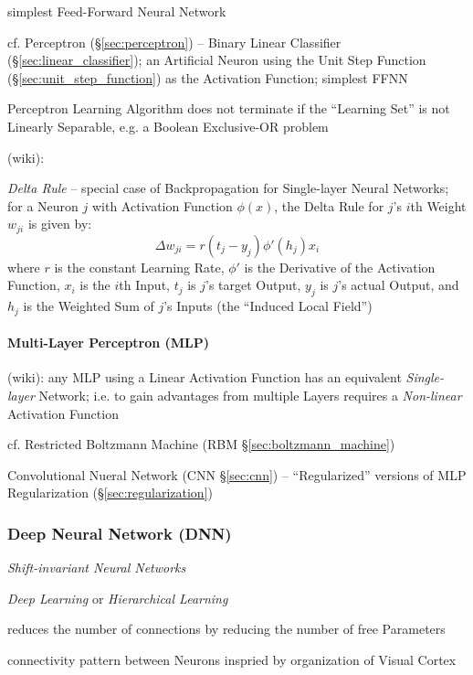 simplest Feed-Forward Neural Network

cf. Perceptron (\S\ref{sec:perceptron}) -- Binary Linear Classifier
(\S\ref{sec:linear_classifier}); an Artificial Neuron using the Unit Step
Function (\S\ref{sec:unit_step_function}) as the Activation Function; simplest
FFNN

Perceptron Learning Algorithm does not terminate if the ``Learning Set'' is not
Linearly Separable, e.g. a Boolean Exclusive-OR problem

(wiki):

\emph{Delta Rule} -- special case of Backpropagation for Single-layer Neural
Networks; for a Neuron $j$ with Activation Function $\phi(x)$, the Delta Rule
for $j$'s $i$th Weight $w_{ji}$ is given by:
\[
  \Delta w_{ji} = r(t_j - y_j) \phi'(h_j) x_i
\]
where $r$ is the constant Learning Rate, $\phi'$ is the Derivative of the
Activation Function, $x_i$ is the $i$th Input, $t_j$ is $j$'s target Output,
$y_j$ is $j$'s actual Output, and $h_j$ is the Weighted Sum of $j$'s Inputs (the
``Induced Local Field'')



\paragraph{Multi-Layer Perceptron (MLP)}\label{sec:mlp}\hfill

(wiki): any MLP using a Linear Activation Function has an equivalent
\emph{Single-layer} Network; i.e. to gain advantages from multiple Layers
requires a \emph{Non-linear} Activation Function

cf. Restricted Boltzmann Machine (RBM \S\ref{sec:boltzmann_machine})

\fist Convolutional Nueral Network (CNN \S\ref{sec:cnn}) -- ``Regularized''
versions of MLP \fist Regularization (\S\ref{sec:regularization})



\subsubsection{Deep Neural Network (DNN)}\label{sec:dnn}

\emph{Shift-invariant Neural Networks}

\emph{Deep Learning} or \emph{Hierarchical Learning}

reduces the number of connections by reducing the number of free Parameters

connectivity pattern between Neurons inspried by organization of Visual Cortex

